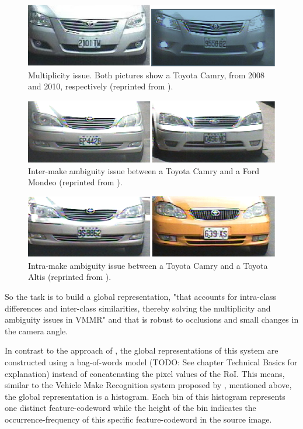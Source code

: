 \begin{figure}[bth]
  \centering
        \includegraphics[width=.75\linewidth]{gfx/multiplicity_reprint}
        \caption{Multiplicity issue. Both pictures show a Toyota Camry, from 2008 and 2010, respectively (reprinted from \citep{siddiqui2015robust}).}
        \label{fig:vmmrMultiplicity}
\end{figure}
\begin{figure}[bth]
  \centering
        \includegraphics[width=.75\linewidth]{gfx/ambiguity_intermake_reprint}
        \caption{Inter-make ambiguity issue between a Toyota Camry and a Ford Mondeo (reprinted from \citep{siddiqui2015robust}).}
        \label{fig:vmmrAmbiguityInterMake}
\end{figure}
\begin{figure}[bth]
  \centering
        \includegraphics[width=.75\linewidth]{gfx/ambiguity_intramake_reprint}
        \caption{Intra-make ambiguity issue between a Toyota Camry and a Toyota Altis (reprinted from \citep{siddiqui2015robust}).}
        \label{fig:vmmrAmbiguityIntraMake}
\end{figure}

So the task is to build a global representation, "that accounts for intra-class differences and inter-class similarities, thereby solving the multiplicity and ambiguity issues in VMMR" \citep{siddiqui2015robust} and that is robust to occlusions and small changes in the camera angle.

In contrast to the approach of \citeauthor{petrovic2004analysis}, the global representations of this system are constructed using a bag-of-words model (TODO: See chapter Technical Basics for explanation) instead of concatenating the pixel values of the RoI. This means, similar to the Vehicle Make Recognition system proposed by \citep{yu2013vehicle}, mentioned above, the global representation is a histogram. Each bin of this histogram represents one distinct feature-codeword while the height of the bin indicates the occurrence-frequency of this specific feature-codeword in the source image.

